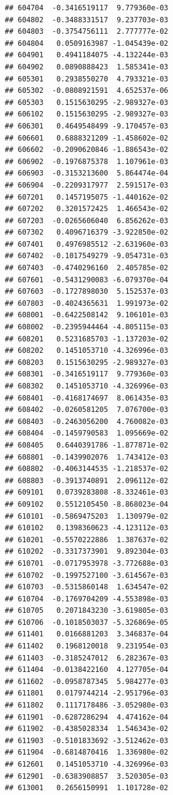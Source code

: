 \documentclass[ignorenonframetext,]{beamer}
\begin{document}
\begin{frame}[fragile]
\begin{verbatim}
## 604704  -0.3416519117  9.779360e-03
## 604802  -0.3488331517  9.237703e-03
## 604803  -0.3754756111  2.777777e-02
## 604804   0.0509163987 -1.045439e-02
## 604901   0.4941184075 -4.132244e-03
## 604902   0.0890888423  1.585341e-03
## 605301   0.2938550270  4.793321e-03
## 605302  -0.0808921591  4.652537e-06
## 605303   0.1515630295 -2.989327e-03
## 606102   0.1515630295 -2.989327e-03
## 606301   0.4649548499 -9.170457e-03
## 606601   0.6888321209 -1.458602e-02
## 606602  -0.2090620846 -1.886543e-02
## 606902  -0.1976875378  1.107961e-03
## 606903  -0.3153213600  5.864474e-04
## 606904  -0.2209317977  2.591517e-03
## 607201   0.1457195075 -1.440162e-02
## 607202   0.3201572425  1.466543e-02
## 607203  -0.0265606040  6.856262e-03
## 607302   0.4096716379 -3.922850e-02
## 607401   0.4976985512 -2.631960e-03
## 607402  -0.1017549279 -9.054731e-03
## 607403  -0.4740296160  2.405785e-02
## 607601  -0.5431290083 -6.079370e-04
## 607603  -0.1727898030  5.152537e-03
## 607803  -0.4024365631  1.991973e-02
## 608001  -0.6422508142  9.106101e-03
## 608002  -0.2395944464 -4.805115e-03
## 608201   0.5231685703 -1.137203e-02
## 608202   0.1451053710 -4.326996e-03
## 608203   0.1515630295 -2.989327e-03
## 608301  -0.3416519117  9.779360e-03
## 608302   0.1451053710 -4.326996e-03
## 608401  -0.4168174697  8.061435e-03
## 608402  -0.0260581205  7.076700e-03
## 608403  -0.2463056200  4.760082e-03
## 608404  -0.1459790583  1.095669e-02
## 608405   0.6440391786 -1.877871e-02
## 608801  -0.1439902076  1.743412e-03
## 608802  -0.4063144535 -1.218537e-02
## 608803  -0.3913740891  2.096112e-02
## 609101   0.0739283808 -8.332461e-03
## 609102   0.5512105450 -8.868023e-04
## 610101  -0.5869475203  1.130979e-02
## 610102   0.1398360623 -4.123112e-03
## 610201  -0.5570222886  1.387637e-02
## 610202  -0.3317373901  9.892304e-03
## 610701  -0.0717953978 -3.772688e-03
## 610702  -0.1997527100 -3.614567e-03
## 610703  -0.5315860148  1.634547e-02
## 610704  -0.1769704209 -4.553898e-03
## 610705   0.2071843230 -3.619805e-03
## 610706  -0.1018503037 -5.326869e-05
## 611401   0.0166881203  3.346837e-04
## 611402   0.1968120018  9.231954e-03
## 611403  -0.3185247012  6.282367e-03
## 611404  -0.0138422160  4.127705e-04
## 611602  -0.0958787345  5.984277e-03
## 611801   0.0179744214 -2.951796e-03
## 611802   0.1117178486 -3.052980e-03
## 611901  -0.6287286294  4.474162e-04
## 611902  -0.4385028334  1.546343e-02
## 611903  -0.5101833692 -3.512462e-03
## 611904  -0.6814870416  1.336980e-02
## 612601   0.1451053710 -4.326996e-03
## 612901  -0.6383908857  3.520305e-03
## 613001   0.2656150991  1.101728e-02

\end{verbatim}
\end{frame}
\end{document}
